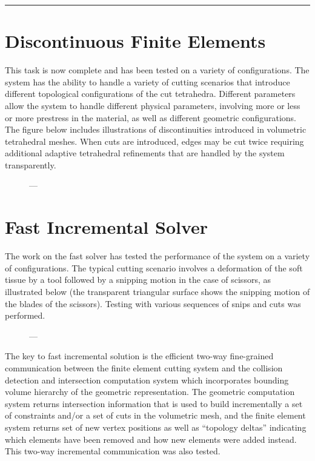 \hrule%

\section{Discontinuous Finite Elements}
This task is now complete and has been tested on a variety of configurations. The system has the ability to handle a variety of cutting scenarios that introduce different topological configurations of the cut tetrahedra. Different parameters allow the system to handle different physical parameters, involving more or less or more prestress in the material, as well as different geometric configurations. The figure below includes illustrations of discontinuities introduced in volumetric tetrahedral meshes.  When cuts are introduced, edges may be cut twice requiring additional adaptive tetrahedral refinements that are handled by the system transparently.

\begin{figure}
  \centering%
  \setlength{\fboxsep}{0pt}%
  \setlength{\fboxrule}{0.1pt}%
  \hfill%
  \hfill%
  \caption{---}\label{fig:cuts}
\end{figure}

\section{Fast Incremental Solver}
The work on the fast solver has tested the performance of the system on a variety of configurations. The typical cutting scenario involves a deformation of the soft tissue by a tool followed by a snipping motion in the case of scissors, as illustrated below (the transparent triangular surface shows the snipping motion of the blades of the scissors).  Testing with various sequences of snips and cuts was performed.

\begin{figure}
  \centering%
  \setlength{\fboxsep}{0pt}%
  \setlength{\fboxrule}{0.1pt}%
  \caption{---}\label{fig:contact}
\end{figure}

The key to fast incremental solution is the efficient two-way fine-grained communication between the finite element cutting system and the collision detection and intersection computation system which incorporates bounding volume hierarchy of the geometric representation. The geometric computation system returns intersection information that is used to build incrementally a set of constraints and/or a set of cuts in the volumetric mesh, and the finite element system returns set of new vertex positions as well as ``topology deltas'' indicating which elements have been removed and how new elements were added instead. This two-way incremental communication was also tested.

